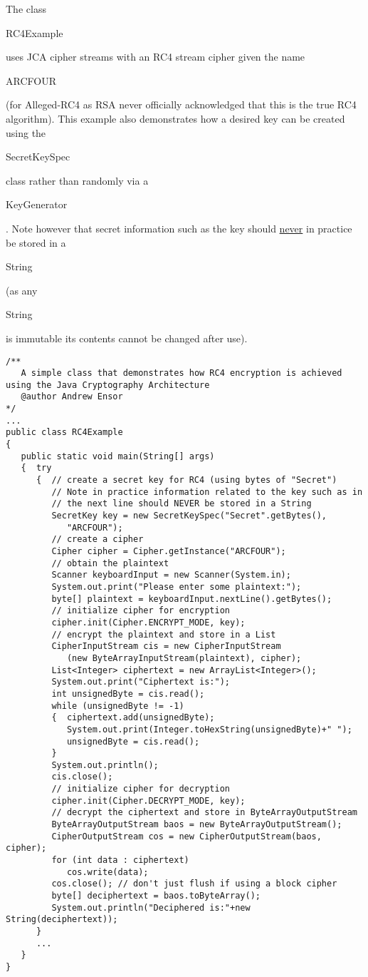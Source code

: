 The class \begin{code}RC4Example\end{code} uses JCA cipher streams
with an RC4 stream cipher given the name
\begin{code}ARCFOUR\end{code} (for Alleged-RC4 as RSA never officially
acknowledged that this is the true RC4 algorithm).
This example also demonstrates how a desired key can be created
using the \begin{code}SecretKeySpec\end{code} class rather than randomly
via a \begin{code}KeyGenerator\end{code}. Note however that
secret information such as the key should \underline{never} in practice
be stored in a \begin{code}String\end{code} (as any \begin{code}String\end{code}
is immutable its contents cannot be changed after use).
\begin{lstlisting}[caption=RC4 encryption]
/**
   A simple class that demonstrates how RC4 encryption is achieved using the Java Cryptography Architecture
   @author Andrew Ensor
*/
...
public class RC4Example
{
   public static void main(String[] args)
   {  try
      {  // create a secret key for RC4 (using bytes of "Secret")
         // Note in practice information related to the key such as in
         // the next line should NEVER be stored in a String
         SecretKey key = new SecretKeySpec("Secret".getBytes(),
            "ARCFOUR");
         // create a cipher
         Cipher cipher = Cipher.getInstance("ARCFOUR");
         // obtain the plaintext
         Scanner keyboardInput = new Scanner(System.in);
         System.out.print("Please enter some plaintext:");
         byte[] plaintext = keyboardInput.nextLine().getBytes();
         // initialize cipher for encryption
         cipher.init(Cipher.ENCRYPT_MODE, key);
         // encrypt the plaintext and store in a List
         CipherInputStream cis = new CipherInputStream
            (new ByteArrayInputStream(plaintext), cipher);
         List<Integer> ciphertext = new ArrayList<Integer>();
         System.out.print("Ciphertext is:");
         int unsignedByte = cis.read();
         while (unsignedByte != -1)
         {  ciphertext.add(unsignedByte);
            System.out.print(Integer.toHexString(unsignedByte)+" ");
            unsignedByte = cis.read();
         }
         System.out.println();
         cis.close();
         // initialize cipher for decryption
         cipher.init(Cipher.DECRYPT_MODE, key);
         // decrypt the ciphertext and store in ByteArrayOutputStream
         ByteArrayOutputStream baos = new ByteArrayOutputStream();
         CipherOutputStream cos = new CipherOutputStream(baos, cipher);
         for (int data : ciphertext)
            cos.write(data);
         cos.close(); // don't just flush if using a block cipher
         byte[] deciphertext = baos.toByteArray();
         System.out.println("Deciphered is:"+new String(deciphertext));
      }
      ...
   }
}
\end{lstlisting}

